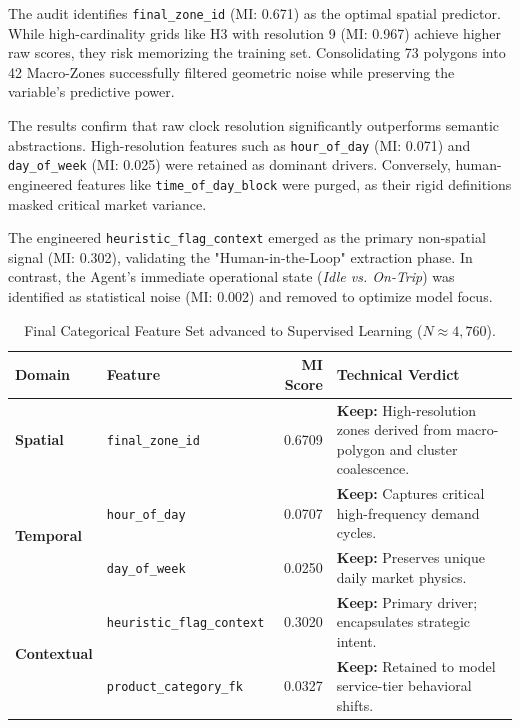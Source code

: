 The audit identifies \texttt{final\_zone\_id} (MI: 0.671) as the optimal spatial predictor. While high-cardinality grids like H3 with resolution 9 (MI: 0.967) achieve higher raw scores, they risk memorizing the training set. Consolidating 73 polygons into 42 Macro-Zones successfully filtered geometric noise while preserving the variable's predictive power.

The results confirm that raw clock resolution significantly outperforms semantic abstractions. High-resolution features such as \texttt{hour\_of\_day} (MI: 0.071) and \texttt{day\_of\_week} (MI: 0.025) were retained as dominant drivers. Conversely, human-engineered features like \texttt{time\_of\_day\_block} were purged, as their rigid definitions masked critical market variance.

The engineered \texttt{heuristic\_flag\_context} emerged as the primary non-spatial signal (MI: 0.302), validating the "Human-in-the-Loop" extraction phase. In contrast, the Agent's immediate operational state (\textit{Idle vs. On-Trip}) was identified as statistical noise (MI: 0.002) and removed to optimize model focus.

\begin{table}[H]
    \centering
    \small
    \begin{tabularx}{\textwidth}{l l r X}
        \toprule
        \textbf{Domain} & \textbf{Feature} & \textbf{MI Score} & \textbf{Technical Verdict} \\
        \midrule
        \textbf{Spatial} & \texttt{final\_zone\_id} & 0.6709 & \textbf{Keep:} High-resolution zones derived from macro-polygon and cluster coalescence. \\
        \midrule
        \multirow{2}{*}{\textbf{Temporal}} 
        & \texttt{hour\_of\_day} & 0.0707 & \textbf{Keep:} Captures critical high-frequency demand cycles. \\
        & \texttt{day\_of\_week} & 0.0250 & \textbf{Keep:} Preserves unique daily market physics. \\
        \midrule
        \multirow{2}{*}{\textbf{Contextual}} 
        & \texttt{heuristic\_flag\_context} & 0.3020 & \textbf{Keep:} Primary driver; encapsulates strategic intent. \\
        & \texttt{product\_category\_fk} & 0.0327 & \textbf{Keep:} Retained to model service-tier behavioral shifts. \\
        \bottomrule
    \end{tabularx}
    \caption{Final Categorical Feature Set advanced to Supervised Learning ($N \approx 4,760$).}
    \label{tab:cfs_final_set}
\end{table}

